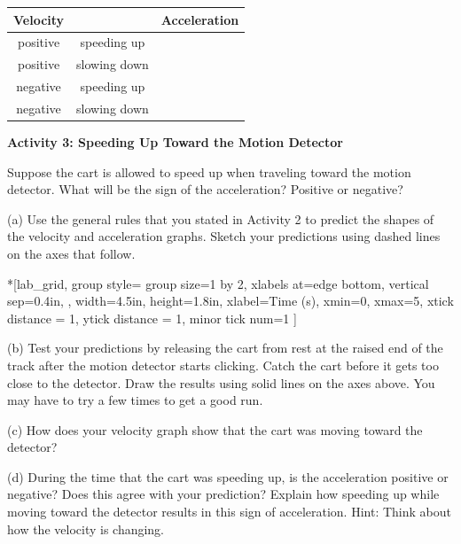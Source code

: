 \vspace{0.3cm}
{\centering \begin{tabular}{|c|c|c|}
\hline
Velocity&
&
Acceleration\\
\hline
positive&
speeding up&
\\
\hline
positive&
slowing down&
\\
\hline
negative&
speeding up&
\\
\hline
negative&
slowing down&
\\
\hline
\end{tabular}\par}
\vspace{0.3cm}


\pagebreak[2]
\textbf{Activity 3: Speeding Up Toward the Motion Detector} 

Suppose the cart is allowed to speed up when traveling toward the motion 
detector. What will be the sign of the acceleration? Positive or negative? 

(a) Use the general rules that you stated in Activity 2 to predict the shapes
of the velocity and acceleration graphs. Sketch your predictions using dashed
lines on the axes that follow.

\begin{lab_groupplot}*{}[lab_grid,
	group style={
		group size=1 by 2,
		xlabels at=edge bottom,
		vertical sep=0.4in,
		},
	width=4.5in,  height=1.8in,
	xlabel=Time (s),
	xmin=0, xmax=5,
	xtick distance = 1, 
	ytick distance = 1, 
	minor tick num=1
	]
\nextgroupplot[
	ymin=-1,ymax=1, 
	ylabel={Velocity (m/s)},
	]
\nextgroupplot[
	ymin=-1,ymax=1, 
	ylabel={Acceleration (m/s$^2$)},
	]
\end{lab_groupplot}

(b) Test your predictions by releasing the cart from rest at the raised end of the track after the motion detector starts clicking. Catch the cart before it gets too close to the detector.  
Draw the results using solid lines on the axes above. You may have to try a
few times to get a good run.

(c) How does your velocity graph show that the cart was moving toward the detector? 
\answerspace{20mm}

(d) During the time that the cart was speeding up, is the acceleration positive
or negative? Does this agree with your prediction? Explain how speeding up while
moving toward the detector results in this sign of acceleration. Hint: Think
about how the velocity is changing.
\answerspace{20mm}

